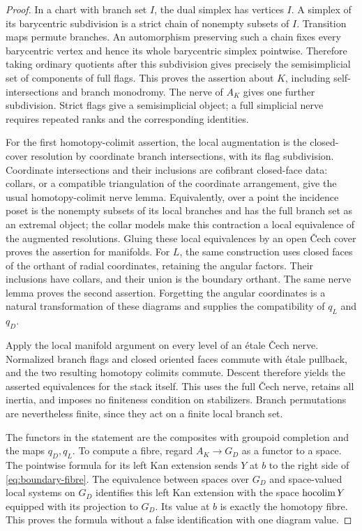 \begin{proof}
In a chart with branch set $I$, the dual simplex has vertices $I$. A simplex of its barycentric subdivision is a strict chain of nonempty subsets of $I$. Transition maps permute branches. An automorphism preserving such a chain fixes every barycentric vertex and hence its whole barycentric simplex pointwise. Therefore taking ordinary quotients after this subdivision gives precisely the semisimplicial set of components of full flags. This proves the assertion about $K$, including self-intersections and branch monodromy. The nerve of $A_K$ gives one further subdivision. Strict flags give a semisimplicial object; a full simplicial nerve requires repeated ranks and the corresponding identities.

For the first homotopy-colimit assertion, the local augmentation is the closed-cover resolution by coordinate branch intersections, with its flag subdivision. Coordinate intersections and their inclusions are cofibrant closed-face data: collars, or a compatible triangulation of the coordinate arrangement, give the usual homotopy-colimit nerve lemma. Equivalently, over a point the incidence poset is the nonempty subsets of its local branches and has the full branch set as an extremal object; the collar models make this contraction a local equivalence of the augmented resolutions. Gluing these local equivalences by an open Čech cover proves the assertion for manifolds. For $L$, the same construction uses closed faces of the orthant of radial coordinates, retaining the angular factors. Their inclusions have collars, and their union is the boundary orthant. The same nerve lemma proves the second assertion. Forgetting the angular coordinates is a natural transformation of these diagrams and supplies the compatibility of $q_L$ and $q_D$.

Apply the local manifold argument on every level of an étale Čech nerve. Normalized branch flags and closed oriented faces commute with étale pullback, and the two resulting homotopy colimits commute. Descent therefore yields the asserted equivalences for the stack itself. This uses the full Čech nerve, retains all inertia, and imposes no finiteness condition on stabilizers. Branch permutations are nevertheless finite, since they act on a finite local branch set.

The functors in the statement are the composites with groupoid completion and the maps $q_D,q_L$. To compute a fibre, regard $A_K\to G_D$ as a functor to a space. The pointwise formula for its left Kan extension sends $Y$ at $b$ to the right side of \eqref{eq:boundary-fibre}. The equivalence between spaces over $G_D$ and space-valued local systems on $G_D$ identifies this left Kan extension with the space $\operatorname*{hocolim} Y$ equipped with its projection to $G_D$. Its value at $b$ is exactly the homotopy fibre. This proves the formula without a false identification with one diagram value.


\end{proof}
